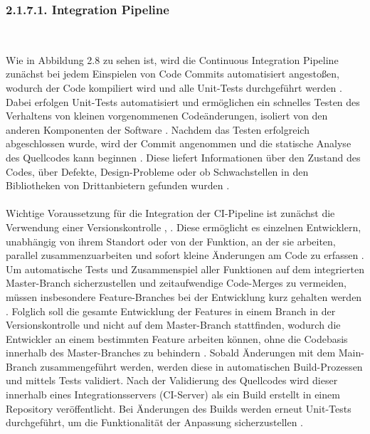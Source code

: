 \subsubsection{2.1.7.1. Integration Pipeline} $~$

Wie in Abbildung 2.8 zu sehen ist, wird die Continuous Integration Pipeline zunächst bei jedem Einspielen von Code Commits automatisiert angestoßen, wodurch der Code kompiliert wird und alle Unit-Tests durchgeführt werden \cite[S. 266]{tokarski_strategische_2018}. Dabei erfolgen Unit-Tests automatisiert und ermöglichen ein schnelles Testen des Verhaltens von kleinen vorgenommenen Codeänderungen, isoliert von den anderen Komponenten der Software \cite[S. 60]{humble_continuous_2011}. Nachdem das Testen erfolgreich abgeschlossen wurde, wird der Commit angenommen und die statische Analyse des Quellcodes kann beginnen \cite[S. 61]{verona_practical_2016}. Diese liefert Informationen über den Zustand des Codes, über Defekte, Design-Probleme oder ob Schwachstellen in den Bibliotheken von Drittanbietern gefunden wurden \cite[S. 61]{verona_practical_2016}.\\\\ Wichtige Voraussetzung für die Integration der CI-Pipeline ist zunächst die Verwendung einer Versionskontrolle \cite[S. 100 - 101]{bass_devops_2015}, \cite[S. 57]{forsgren_mindset_2019}. Diese ermöglicht es einzelnen Entwicklern, unabhängig von ihrem Standort oder von der Funktion, an der sie arbeiten, parallel zusammenzuarbeiten und sofort kleine Änderungen am Code zu erfassen \cite[S. 57]{humble_continuous_2011}. Um automatische Tests und Zusammenspiel aller Funktionen auf dem integrierten Master-Branch sicherzustellen und zeitaufwendige Code-Merges zu vermeiden, müssen insbesondere Feature-Branches bei der Entwicklung kurz gehalten werden \cite{meyer_continuous_2014}. Folglich soll die gesamte Entwicklung der Features in einem Branch in der Versionskontrolle und nicht auf dem Master-Branch stattfinden, wodurch die Entwickler an einem bestimmten Feature arbeiten können, ohne die Codebasis innerhalb des Master-Branches zu behindern \cite[S. 44 - 45]{verona_practical_2016}. Sobald Änderungen mit dem Main-Branch zusammengeführt werden, werden diese in automatischen Build-Prozessen und mittels Tests validiert. Nach der Validierung des Quellcodes wird dieser innerhalb eines Integrationsservers (CI-Server) als ein Build erstellt in einem Repository veröffentlicht. Bei Änderungen des Builds werden erneut Unit-Tests durchgeführt, um die Funktionalität der Anpassung sicherzustellen \cite[S. 57]{forsgren_mindset_2019}. 


